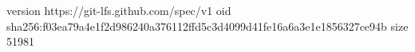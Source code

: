 version https://git-lfs.github.com/spec/v1
oid sha256:f03ea79a4e1f2d986240a376112ffd5c3d4099d41fe16a6a3e1e1856327ce94b
size 51981
